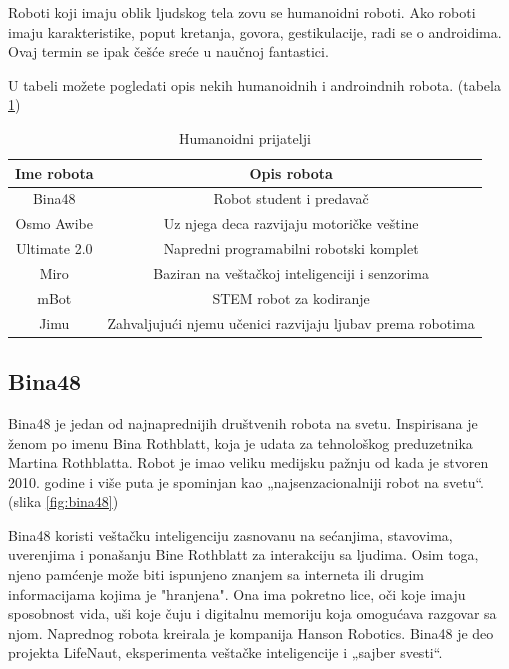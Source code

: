 \documentclass[a4paper]{article}
\begin{document}
Roboti koji imaju oblik ljudskog tela zovu se humanoidni roboti. Ako roboti imaju karakteristike, poput kretanja, govora, gestikulacije, radi se o androidima. Ovaj termin se ipak češće sreće u naučnoj fantastici. 

U tabeli možete pogledati opis nekih humanoidnih i androindnih robota. (tabela \ref{tab:tabela1})

\begin{table}[ht!]
\begin{center}
\caption{Humanoidni prijatelji}
\begin{tabular}{|c|c|} \hline
Ime robota& Opis robota\\ \hline
Bina48 & Robot student i predavač\\ \hline
Osmo Awibe &Uz njega deca razvijaju motoričke veštine\\ \hline
Ultimate 2.0 &Napredni programabilni robotski komplet\\ \hline
Miro &Baziran na veštačkoj inteligenciji i senzorima\\ \hline
mBot &STEM robot za kodiranje\\ \hline
Jimu &Zahvaljujući njemu učenici razvijaju ljubav prema robotima\\ \hline
\end{tabular}
\label{tab:tabela1}
\end{center}
\end{table}

\newpage
\subsection{Bina48}
\label{subsec:podnaslov1}

Bina48 je jedan od najnaprednijih društvenih robota na svetu. Inspirisana je ženom po imenu Bina Rothblatt, koja je udata za tehnološkog preduzetnika Martina Rothblatta. Robot je imao veliku medijsku pažnju od kada je stvoren 2010. godine i više puta je spominjan kao „najsenzacionalniji robot na svetu“. (slika \ref{fig:bina48})

Bina48 koristi veštačku inteligenciju zasnovanu na sećanjima, stavovima, uverenjima i ponašanju Bine Rothblatt za interakciju sa ljudima. Osim toga, njeno pamćenje može biti ispunjeno znanjem sa interneta ili drugim informacijama kojima je "hranjena". Ona ima pokretno lice, oči koje imaju sposobnost vida, uši koje čuju i digitalnu memoriju koja omogućava razgovar sa njom. Naprednog robota kreirala je kompanija Hanson Robotics. Bina48 je deo projekta LifeNaut, eksperimenta veštačke inteligencije i „sajber svesti“.
\end{document}
